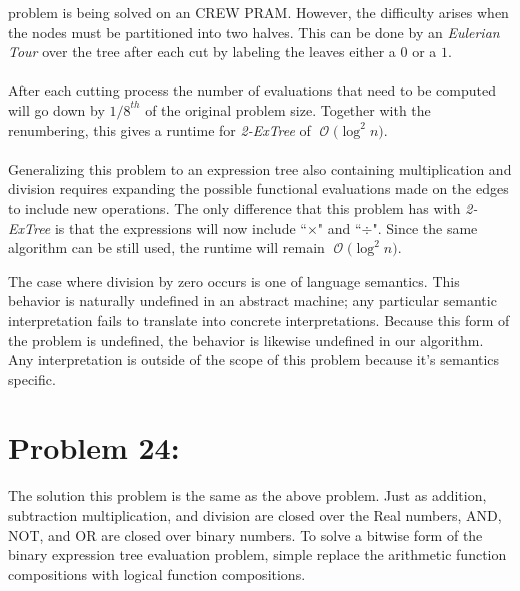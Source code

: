 \documentclass[12pt]{article}
\newcommand{\BigO}[1]{\ensuremath{\operatorname{\mathcal{O}}\bigl(#1\bigr)}}
\begin{document}
problem is being solved on an CREW PRAM\@.  However, the difficulty
arises when the nodes must be partitioned into two halves.  This
can be done by an \textit{Eulerian Tour} over the tree after
each cut by labeling the leaves either a $0$ or a $1$.\\\\
After each cutting process the number of evaluations that
need to be computed will go down by ${1/8}^{th}$ of the original
problem size.  Together with the renumbering, this gives a runtime
for \textit{2-ExTree} of \BigO{\log^2 n}.\\\\
Generalizing this problem to an expression tree also containing
multiplication and division requires expanding the possible functional
evaluations made on the edges to include new operations.  The only
difference that this problem has with \textit{2-ExTree} is that the
expressions will now include ``$\times$" and ``$\div$".  Since the
same algorithm can be still used, the runtime will remain \BigO{\log^2 n}.   

The case where division by zero occurs is one of language semantics. This behavior is naturally undefined in an abstract machine; any particular semantic interpretation fails to translate into concrete interpretations. Because this form of the problem is undefined, the behavior is likewise undefined in our algorithm. Any interpretation is outside of the scope of this problem because it's semantics specific.

\section*{Problem 24: }

The solution this problem is the same as the above problem. Just as addition, subtraction multiplication, and division are closed over the Real numbers, AND, NOT, and OR are closed over binary numbers. To solve a bitwise form of the binary expression tree evaluation problem, simple replace the arithmetic function compositions with logical function compositions.
\end{document}
